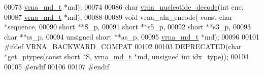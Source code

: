 \begin{DoxyCode}
00073                             \hyperlink{structvrna__md__s}{vrna\_md\_t} *md);
00074 
00086 \textcolor{keywordtype}{char} \hyperlink{group__utils_ga48ef585e697be9c8a08ed68c655e29b6}{vrna\_nucleotide\_decode}(\textcolor{keywordtype}{int} enc,
00087                             \hyperlink{structvrna__md__s}{vrna\_md\_t} *md);
00088 
00089 \textcolor{keywordtype}{void} vrna\_aln\_encode( \textcolor{keyword}{const} \textcolor{keywordtype}{char} *sequence,
00090                       \textcolor{keywordtype}{short} **S\_p,
00091                       \textcolor{keywordtype}{short} **s5\_p,
00092                       \textcolor{keywordtype}{short} **s3\_p,
00093                       \textcolor{keywordtype}{char} **ss\_p,
00094                       \textcolor{keywordtype}{unsigned} \textcolor{keywordtype}{short} **as\_p,
00095                       \hyperlink{structvrna__md__s}{vrna\_md\_t} *md);
00096 
00101 \textcolor{preprocessor}{#ifdef  VRNA\_BACKWARD\_COMPAT}
00102 
00103 DEPRECATED(\textcolor{keywordtype}{char}  *get\_ptypes(\textcolor{keyword}{const} \textcolor{keywordtype}{short} *S, \hyperlink{structvrna__md__s}{vrna\_md\_t} *md, \textcolor{keywordtype}{unsigned} \textcolor{keywordtype}{int} idx\_type));
00104 
00105 \textcolor{preprocessor}{#endif}
00106 
00107 \textcolor{preprocessor}{#endif}
\end{DoxyCode}
